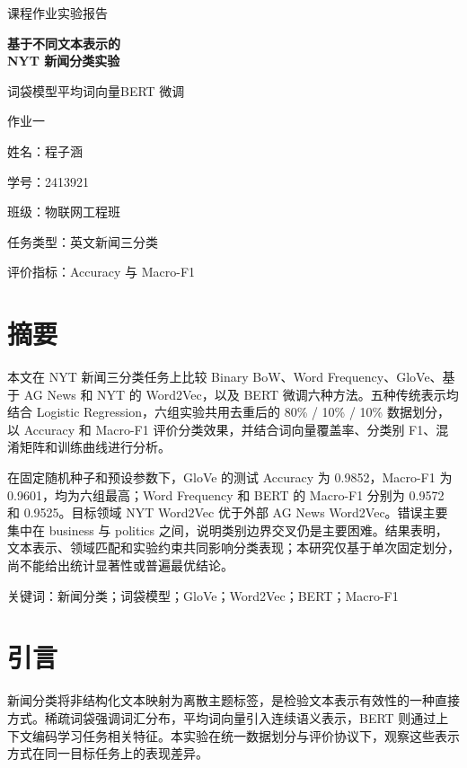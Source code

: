 \documentclass[UTF8,12pt,a4paper,fontset=fandol]{ctexart}
\begin{document}
\begin{titlepage}
\centering
\vspace*{1.3cm}
{\Large 课程作业实验报告\par}
\vspace{2cm}
{\huge\bfseries 基于不同文本表示的\\[0.6em]NYT 新闻分类实验\par}
\vspace{0.8cm}
{\large 词袋模型\quad 平均词向量\quad BERT 微调\par}
\vspace{0.5cm}
{\large 作业一\par}
\vspace{2.4cm}
{\large
姓名：程子涵\par\vspace{0.7em}
学号：2413921\par\vspace{0.7em}
班级：物联网工程班\par}
\vspace{1cm}
任务类型：英文新闻三分类\par
评价指标：Accuracy 与 Macro-F1\par
\vfill
\end{titlepage}
\clearpage
{}
\section*{摘要}
{}
本文在 NYT 新闻三分类任务上比较 Binary BoW、Word Frequency、GloVe、基于 AG News 和 NYT 的 Word2Vec，以及 BERT 微调六种方法。五种传统表示均结合 Logistic Regression，六组实验共用去重后的 80\% / 10\% / 10\% 数据划分，以 Accuracy 和 Macro-F1 评价分类效果，并结合词向量覆盖率、分类别 F1、混淆矩阵和训练曲线进行分析。

在固定随机种子和预设参数下，GloVe 的测试 Accuracy 为 0.9852，Macro-F1 为 0.9601，均为六组最高；Word Frequency 和 BERT 的 Macro-F1 分别为 0.9572 和 0.9525。目标领域 NYT Word2Vec 优于外部 AG News Word2Vec。错误主要集中在 business 与 politics 之间，说明类别边界交叉仍是主要困难。结果表明，文本表示、领域匹配和实验约束共同影响分类表现；本研究仅基于单次固定划分，尚不能给出统计显著性或普遍最优结论。

关键词：新闻分类；词袋模型；GloVe；Word2Vec；BERT；Macro-F1

\clearpage
\tableofcontents
\clearpage
{}
\FloatBarrier
\section{引言}
新闻分类将非结构化文本映射为离散主题标签，是检验文本表示有效性的一种直接方式。稀疏词袋强调词汇分布，平均词向量引入连续语义表示，BERT 则通过上下文编码学习任务相关特征。本实验在统一数据划分与评价协议下，观察这些表示方式在同一目标任务上的表现差异。
\end{document}
